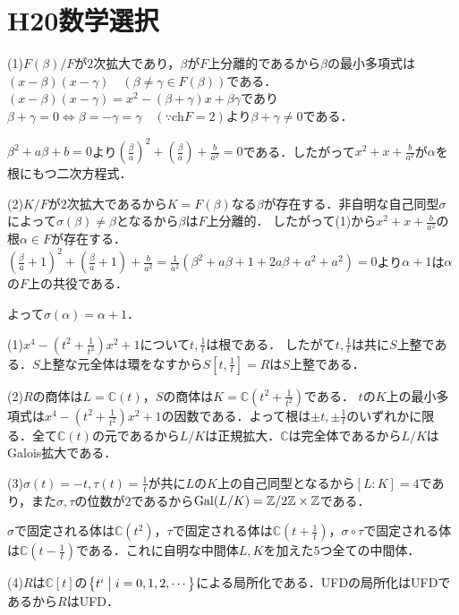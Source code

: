 \documentclass[
		book,
		head_space=20mm,
		foot_space=20mm,
		gutter=10mm,
		line_length=190mm
]{jlreq}
\begin{document}
\section{H20数学選択}
(1)$F(\beta)/F$が$2$次拡大であり，$\beta$が$F$上分離的であるから$\beta$の最小多項式は$(x-\beta)(x-\gamma)\quad(\beta\neq \gamma\in F(\beta))$である．$(x-\beta)(x-\gamma)=x^2-(\beta+\gamma)x+\beta\gamma$であり
$\beta+\gamma=0\Leftrightarrow \beta=-\gamma=\gamma \quad(\because \mathrm{ch}F=2)$より$\beta+\gamma\neq 0$である．

$\beta^2+a\beta+b=0$より$(\frac{\beta}{a})^2+(\frac{\beta}{a})+\frac{b}{a^2}=0$である．したがって$x^2+x+\frac{b}{a^2}$が$\alpha$を根にもつ二次方程式．

(2)$K/F$が$2$次拡大であるから$K=F(\beta)$なる$\beta$が存在する．非自明な自己同型$\sigma$によって$\sigma(\beta)\neq \beta$となるから$\beta$は$F$上分離的．
したがって(1)から$x^2+x+\frac{b}{a^2}$の根$\alpha\in F$が存在する．
$(\frac{\beta}{a}+1)^2+(\frac{\beta}{a}+1)+\frac{b}{a^2}=\frac{1}{a^2}(\beta^2+a\beta+1+2a\beta+a^2+a^2)=0$より$\alpha+1$は$\alpha$の$F$上の共役である．

よって$\sigma(\alpha)=\alpha+1$．

(1)$x^4-(t^2+\frac{1}{t^2})x^2+1$について$t,\frac{1}{t}$は根である．
したがて$t,\frac{1}{t}$は共に$S$上整である．$S$上整な元全体は環をなすから$S[t,\frac{1}{t}]=R$は$S$上整である．

(2)$R$の商体は$L=\mathbb{C}(t)$，$S$の商体は$K=\mathbb{C}(t^2+\frac{1}{t^2})$である．
$t$の$K$上の最小多項式は$x^4-(t^2+\frac{1}{t^2})x^2+1$の因数である．よって根は$\pm t,\pm\frac{1}{t}$のいずれかに限る．全て$\mathbb{C}(t)$の元であるから$L/K$は正規拡大．$\mathbb{C}$は完全体であるから$L/K$はGalois拡大である．

(3)$\sigma(t)=-t,\tau(t)=\frac{1}{t}$が共に$L$の$K$上の自己同型となるから$[L:K]=4$であり，また$\sigma,\tau$の位数が$2$であるから$\mathop{\mathrm{Gal}}(L/K)= \mathbb{Z}/2 \mathbb{Z}\times \mathbb{Z}$である．

$\sigma$で固定される体は$\mathbb{C}(t^2)$，$\tau$で固定される体は$\mathbb{C}(t+\frac{1}{t})$，$\sigma\circ\tau$で固定される体は$\mathbb{C}(t-\frac{1}{t})$である．これに自明な中間体$L,K$を加えた$5$つ全ての中間体．

(4)$R$は$\mathbb{C}[t]$の$\left\{ t^i\mathrel{}\middle|\mathrel{}i=0,1,2,\cdots \right\}$による局所化である．UFDの局所化はUFDであるから$R$はUFD．
\end{document}
